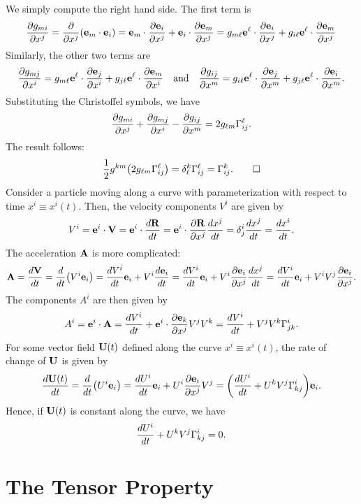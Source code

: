 \documentclass{article}
\begin{document}
	\proof We simply compute the right hand side. The first term is
	\[
	\pdv{g_{mi}}{x^{j}} = \pdv{}{x^{j}} \qty(\vb{e}_{m} \cdot \vb{e}_{i}) 
	= \vb{e}_{m} \cdot \pdv{\vb{e}_{i}}{x^{j}} + \vb{e}_{i} \cdot \pdv{\vb{e}_{m}}{x^{j}} 
	= g_{m\ell} \vb{e}^{\ell} \cdot \pdv{\vb{e}_{i}}{x^{j}} + g_{i\ell} \vb{e}^{\ell} \cdot \pdv{\vb{e}_{m}}{x^{j}}
	\]
	Similarly, the other two terms are
	\[
	\pdv{g_{mj}}{x^{i}} = g_{m\ell} \vb{e}^{\ell} \cdot \pdv{\vb{e}_{j}}{x^{i}} + g_{j\ell} \vb{e}^{\ell} \cdot \pdv{\vb{e}_{m}}{x^{i}} \qq{and} \pdv{g_{ij}}{x^{m}} = g_{i\ell} \vb{e}^{\ell} \cdot \pdv{\vb{e}_{j}}{x^{m}} + g_{j\ell} \vb{e}^{\ell} \cdot \pdv{\vb{e}_{i}}{x^{m}}.
	\]
	Substituting the Christoffel symbols, we have
	\[
	\pdv{g_{mi}}{x^{j}} + \pdv{g_{mj}}{x^{i}} - \pdv{g_{ij}}{x^{m}} = 2 g_{\ell m} \Gamma^{\ell}_{ij}.
	\]
	The result follows:
	\[
	\frac{1}{2} g^{km}\qty( 2 g_{\ell m} \Gamma^{\ell}_{ij} ) = \delta^{k}_{\ell} \Gamma^{\ell}_{ij} = \Gamma^{k}_{ij}. \qed
	\]
	 Consider a particle moving along a curve with parameterization with respect to time $ x^{i} \equiv x^{i}(t) $. Then, the velocity components $ V^{i} $ are given by
	\[
	V^{i} = \vb{e}^{i} \cdot \vb{V} = \vb{e}^{i} \cdot \dv{\vb{R}}{t} = \vb{e}^{i} \cdot \pdv{\vb{R}}{x^{j}}\dv{x^{j}}{t} = \delta^{i}_{j} \dv{x^{j}}{t} = \dv{x^{i}}{t}.
	\]
	 The acceleration $ \vb{A} $ is more complicated:
	\[
	\vb{A} = \dv{\vb{V}}{t} = \dv{}{t}\qty(V^{i} \vb{e}_{i}) = \dv{V^{i}}{t} \vb{e}_{i} + V^{i} \dv{\vb{e}_{i}}{t} = \dv{V^{i}}{t} \vb{e}_{i} + V^{i} \pdv{\vb{e}_{i}}{x^{j}}\dv{x^{j}}{t} = \dv{V^{i}}{t} \vb{e}_{i} + V^{i} V^{j} \pdv{\vb{e}_{i}}{x^{j}}.
	\]
	The components $ A^{i} $ are then given by
	\[
	A^{i} = \vb{e}^{i} \cdot \vb{A} = \dv{V^{i}}{t} + \vb{e}^{i} \cdot \pdv{\vb{e}_{k}}{x^{j}} V^{j}V^{k} = \dv{V^{i}}{t} + V^{j}V^{k} \Gamma^{i}_{jk}.
	\]
	 For some vector field $ \vb{U}(t) $ defined along the curve $ x^{i} \equiv x^{i}(t) $, the rate of change of $ \vb{U} $ is given by
	\[
	\dv{\vb{U}(t)}{t} = \dv{}{t} \qty(U^{i}\vb{e}_{i}) = \dv{U^{i}}{t}\vb{e}_{i} + U^{i} \pdv{\vb{e}_{i}}{x^{j}}V^{j} = \qty(\dv{U^{i}}{t} + U^{k}V^{j}\Gamma^{i}_{kj}) \vb{e}_{i}.
	\]
	Hence, if $ \vb{U}(t) $ is constant along the curve, we have
	\[
	\dv{U^{i}}{t} + U^{k}V^{j}\Gamma^{i}_{kj} = 0.
	\]
	\newpage
	\section{The Tensor Property}
\end{document}
